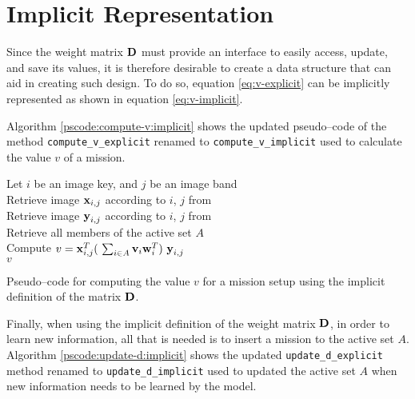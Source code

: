 \section{Implicit Representation} \label{sect:meth:implicit}

Since the weight matrix $\boldsymbol{\mathbf{D}}$ must provide an interface to easily access, update, and save its values, it is therefore desirable to create a data structure that can aid in creating such design. To do so, equation \ref{eq:v-explicit} can be implicitly represented as shown in equation \ref{eq:v-implicit}. \newline

Algorithm \ref{pscode:compute-v:implicit} shows the updated pseudo--code of the method \texttt{compute\_v\_explicit} renamed to \texttt{compute\_v\_implicit} used to calculate the value $v$ of a mission.

\vspace{0.4cm}
\begin{algorithm}[H]
    \SetAlgoLined
         {
            Let $i$ be an image key, and $j$ be an image band \\
            Retrieve image $\boldsymbol{\mathbf{x}}_{i,j}$ according to $i$, $j$ from \usno \\
            Retrieve image $\boldsymbol{\mathbf{y}}_{i,j}$ according to $i$, $j$ from \panstarrs \\
            Retrieve all members of the active set $A$ \\
            Compute $v = \boldsymbol{\mathbf{x}}_{i,j}^T (\ \sum_{i \in A} \boldsymbol{\mathbf{v}}_i \boldsymbol{\mathbf{w}}_i^T )\ \boldsymbol{\mathbf{y}}_{i,j}$ \\
            \Return $v$
        }
    \caption{Pseudo--code for computing the value $v$ for a mission setup using the implicit definition of the matrix $\boldsymbol{\mathbf{D}}$.}
    \label{pscode:compute-v:implicit}
\end{algorithm}
\vspace{0.4cm}

Finally, when using the implicit definition of the weight matrix $\boldsymbol{\mathbf{D}}$, in order to learn new information, all that is needed is to insert a mission to the active set $A$. Algorithm \ref{pscode:update-d:implicit} shows the updated \texttt{update\_d\_explicit} method renamed to \texttt{update\_d\_implicit} used to updated the active set $A$ when new information needs to be learned by the model.

